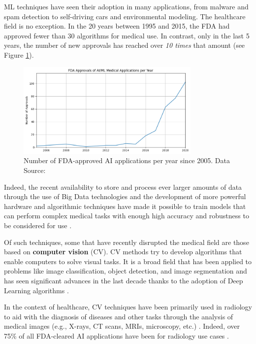 \documentclass[../main.tex]{subfiles}
\begin{document}
    ML techniques have seen their adoption in many applications, from malware and spam detection to self-driving cars and environmental modeling. The healthcare field is no exception. In the 20 years between 1995 and 2015, the FDA had approved fewer than 30 algorithms for medical use. In contrast, only in the last 5 years, the number of new approvals has reached over \textit{10 times} that amount (see Figure \ref{fig:fda_approved_ml_apps}). 

    \begin{figure}[h]
        \centering
        \includegraphics[width=0.8\textwidth]{fda_approved_ml_apps}
        \caption{Number of FDA-approved AI applications per year since 2005. Data Source: \cite{health_artificial_2022}}
        \label{fig:fda_approved_ml_apps}
    \end{figure}
    
    Indeed, the recent availability to store and process ever larger amounts of data through the use of Big Data technologies and the development of more powerful hardware and algorithmic techniques have made it possible to train models that can perform complex medical tasks with enough high accuracy and robustness to be considered for use
    \cite{topol_high-performance_2019}.

    Of such techniques, some that have recently disrupted the medical field are those based on \textbf{computer vision}  (CV). CV methods try to develop algorithms that enable computers to solve visual tasks. It is a broad field that has been applied to problems like image classification, object detection, and image segmentation and has seen significant advances in the last decade thanks to the adoption of Deep Learning algorithms \cite{lecun_deep_2015}.

    In the context of healthcare, CV techniques have been primarily used in radiology to aid with the diagnosis of diseases and other tasks through the analysis of medical images (e.g., X-rays, CT scans, MRIs, microscopy, etc.) \cite{esteva_deep_2021}. Indeed, over 75\% of all FDA-cleared AI applications have been for radiology use cases \cite{health_artificial_2022}.
    
\end{document}
